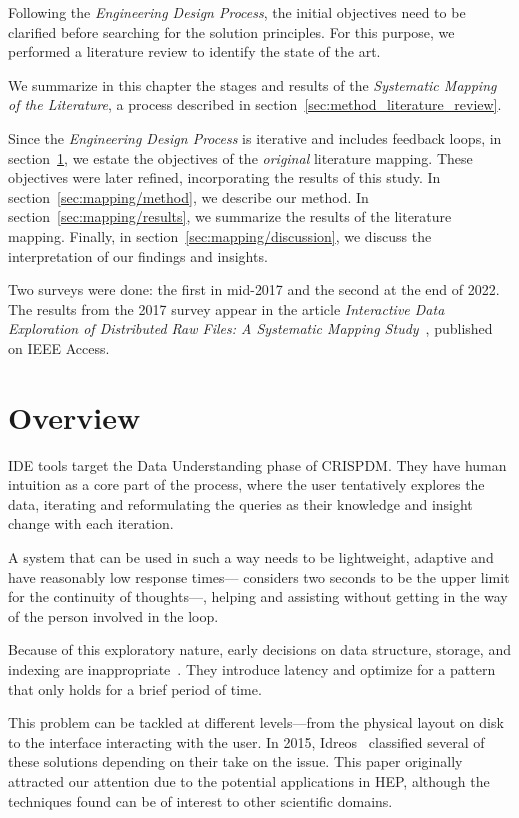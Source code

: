 
Following the \emph{Engineering Design Process}, the initial objectives
need to be clarified before searching for the solution principles.
For this purpose, we performed a literature review to identify the
state of the art.

We summarize in this chapter the stages and results of the
\emph{Systematic Mapping of the Literature}, a process described in section~\ref{sec:method_literature_review}.

Since the \emph{Engineering Design Process} is iterative and includes feedback loops, in
section~\ref{sec:mapping/overview}, we estate the objectives of the
\emph{original} literature mapping. These objectives were later refined,
incorporating the results of this study.
In section~\ref{sec:mapping/method}, we describe our method.
In section~\ref{sec:mapping/results}, we summarize the results of the literature mapping.
Finally, in section~\ref{sec:mapping/discussion}, we discuss the interpretation of our findings
and insights.

Two surveys were done: the first in mid-2017 and the second at the end of 2022.
The results from the 2017 survey appear in the
article \emph{Interactive Data Exploration of Distributed Raw Files: A Systematic Mapping Study}~\cite{Alvarez2019},
published on IEEE Access.

\section{Overview}
\label{sec:mapping/overview}
\gls{IDE} tools target the Data Understanding phase of \gls{CRISPDM}. They have
human intuition as a core part of the process, where the user tentatively
explores the data, iterating and reformulating the queries as
their knowledge and insight change with each iteration.

A system that can be used in such a way needs to be lightweight, adaptive
and have reasonably low response times---\cite{Miller1968} considers two seconds
to be the upper limit for the continuity of thoughts---,
helping and assisting without getting in the way of the person involved in
the loop.

Because of this exploratory nature, early decisions on data structure,
storage, and indexing are inappropriate~\cite{Kersten2011}. They introduce latency
and optimize for a pattern that only holds for a brief period of time.

This problem can be tackled at different levels---from the physical layout on disk
to the interface interacting with the user. In 2015, Idreos~\cite{Idreos2015}
classified several of these solutions depending on their take
on the issue. This paper originally attracted our attention  due to the potential
applications in \gls{HEP}\footnotemark, although
the techniques found can be of interest to other scientific domains.

